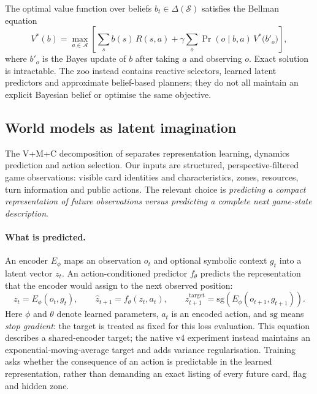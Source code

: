 \documentclass[11pt,a4paper]{article}
\theoremstyle{definition}
\theoremstyle{plain}
\begin{document}
The optimal value function over beliefs $b_t \in \Delta(\mathcal{S})$ satisfies the Bellman equation
\begin{equation}
V^*(b) = \max_{a \in \mathcal{A}} \left[ \sum_s b(s)\, R(s,a)
   + \gamma \sum_o \Pr(o \mid b, a) \, V^*\!\big(b'_o\big) \right],
\end{equation}
where $b'_o$ is the Bayes update of $b$ after taking $a$ and observing $o$. Exact solution is intractable. The zoo instead contains reactive selectors, learned latent predictors and approximate belief-based planners; they do not all maintain an explicit Bayesian belief or optimise the same objective.

\subsection{World models as latent imagination}
\label{sec:jepa-foundation}

The V+M+C decomposition of \citet{ha2018world} separates representation learning, dynamics prediction and action selection. Our inputs are structured, perspective-filtered game observations: visible card identities and characteristics, zones, resources, turn information and public actions. The relevant choice is \emph{predicting a compact representation of future observations versus predicting a complete next game-state description}.

\paragraph{What is predicted.} An encoder $E_\phi$ maps an observation $o_t$ and optional symbolic context $g_t$ into a latent vector $z_t$. An action-conditioned predictor $f_\theta$ predicts the representation that the encoder would assign to the next observed position:
\begin{equation}
z_t=E_\phi(o_t,g_t),\qquad
\hat z_{t+1}=f_\theta(z_t,a_t),\qquad
z^{\mathrm{target}}_{t+1}=\mathrm{sg}\!\left(E_\phi(o_{t+1},g_{t+1})\right).
\label{eq:jepa-target}
\end{equation}
Here $\phi$ and $\theta$ denote learned parameters, $a_t$ is an encoded action, and $\mathrm{sg}$ means \emph{stop gradient}: the target is treated as fixed for this loss evaluation. This equation describes a shared-encoder target; the native v4 experiment instead maintains an exponential-moving-average target and adds variance regularisation. Training asks whether the consequence of an action is predictable in the learned representation, rather than demanding an exact listing of every future card, flag and hidden zone.
\end{document}

